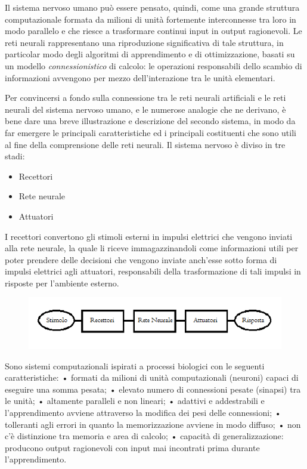 \documentclass[12pt,a4paper,oneside]{book}
\begin{document}
		Il sistema nervoso umano può essere pensato, quindi, come una grande struttura computazionale formata da milioni di unità fortemente interconnesse tra loro in modo parallelo e che riesce a trasformare continui input in output ragionevoli. Le reti neurali rappresentano una riproduzione significativa di tale struttura, in particolar modo degli algoritmi di apprendimento e di ottimizzazione, basati su un modello \emph{connessionistico} di calcolo: le operazioni responsabili dello scambio di informazioni avvengono per mezzo dell'interazione tra le unità elementari.
		
		Per convincersi a fondo sulla connessione tra le reti neurali artificiali e le reti neurali del sistema nervoso umano, e le numerose analogie che ne derivano, è bene dare una breve illustrazione e descrizione del secondo sistema, in modo da far emergere le principali caratteristiche ed i principali costituenti che sono utili al fine della comprensione delle reti neurali.
     	\clearpage
  		Il sistema nervoso è diviso in tre stadi:
		\begin{itemize}
			\item Recettori
			\item Rete neurale
			\item Attuatori
		\end{itemize}
		
		I recettori convertono gli stimoli esterni in impulsi elettrici che vengono inviati alla rete neurale, la quale li riceve immagazzinandoli come informazioni utili per poter prendere delle decisioni che vengono inviate anch'esse sotto forma di impulsi elettrici agli attuatori, responsabili della trasformazione di tali impulsi in risposte per l'ambiente esterno.
	
	\begin{figure}[h]
		\centering
		\includegraphics[width=0.9\linewidth]{IMMAGINI/GRAFOSISTNERV}
		\caption{}
		\label{fig: stadi sistema nervoso}
	\end{figure}
	
	
	
	
		Sono sistemi computazionali ispirati a processi biologici con le seguenti caratteristiche:  • formati da milioni di unità computazionali (neuroni) capaci di eseguire una somma pesata;  • elevato numero di connessioni pesate (sinapsi) tra le unità;  • altamente paralleli e non lineari;  • adattivi e addestrabili e l'apprendimento avviene attraverso la modifica dei pesi delle connessioni;  • tolleranti agli errori in quanto la memorizzazione avviene in modo diffuso;  • non c'è distinzione tra memoria e area di calcolo;  • capacità di generalizzazione: producono output ragionevoli con input mai incontrati prima durante l'apprendimento. 
		
\end{document}
